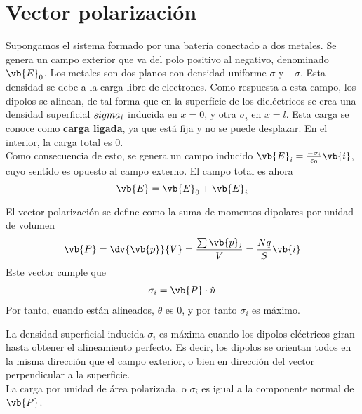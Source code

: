 \documentclass{./FisicaII.tex}
\begin{document}
\section{Vector polarización}
Supongamos el sistema formado por una batería conectado a dos metales. Se genera un campo
exterior que va del polo positivo al negativo, denominado \(\vb{E}_{0}\). Los metales son
dos planos con densidad uniforme \(\sigma \) y \(-\sigma \). Esta densidad se debe a la
carga libre de electrones. Como respuesta a esta campo, los dipolos se alinean, de tal
forma que en la superfície de los dieléctricos se crea una densidad superficial
\(\-sigma _{i}\) inducida en \(x=0\), y otra \(\sigma _{i}\) en \(x=l\). Esta carga se
conoce como \textbf{carga ligada}, ya que está fija y no se puede desplazar. En el
interior, la carga total es \(0\).\\
Como consecuencia de esto, se genera un campo inducido \(\vb{E}_i = \frac{-\sigma _{i}}{\varepsilon _{0}} \vb{i}\), cuyo sentido es
opuesto al campo externo. El campo total es ahora
\[
	\vb{E} = \vb{E}_0 + \vb{E}_i
\]
\begin{defin}
	El vector polarización se define como la suma de momentos dipolares por unidad de volumen
	\begin{equation}
		\begin{split}
			\vb{P} = \dv{\vb{p}}{V} = \frac{\sum \vb{p}_i}{V} = \frac{Nq}{S} \vb{i}
		\end{split}
	\end{equation}
	Este vector cumple que
	\begin{equation}
		\begin{split}
			\sigma _{i} = \vb{P} \cdot \hat{n}
		\end{split}
	\end{equation}
	Por tanto, cuando están alineados, \(\theta \) es \(0\), y por tanto \(\sigma _{i}\)
	es máximo.
\end{defin}
La densidad superficial inducida \(\sigma _{i}\) es máxima cuando los dipolos eléctricos
giran hasta obtener el alineamiento perfecto. Es decir, los dipolos se orientan todos
en la misma dirección que el campo exterior, o bien en dirección del vector
perpendicular a la superficie.\\
La carga por unidad de área polarizada, o \(\sigma _{i}\) es igual a la componente
normal de \(\vb{P}\).
\end{document}

